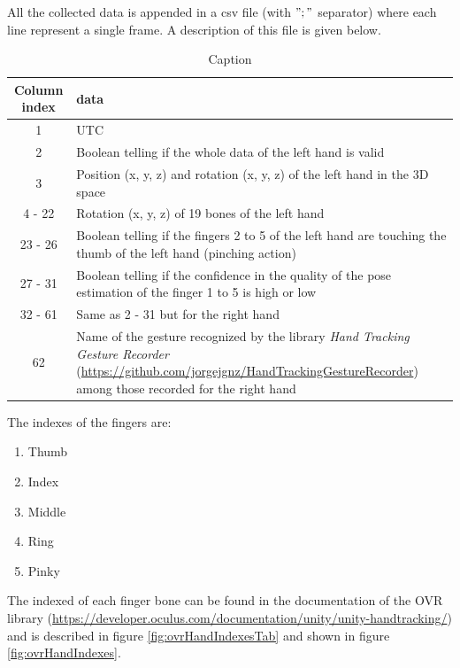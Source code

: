\documentclass{article}
\begin{document}
All the collected data is appended in a csv file (with $";"$ separator) where each line represent a single frame. A description of this file is given below.

\begin{table}[H]
	\centering
	\begin{tabular}{|c|p{12cm}|}
		\hline
		Column index & data \\
		\hline
		1 & UTC \\ \hline
		2 & Boolean telling if the whole data of the left hand is valid \\ \hline
		3 & Position (x, y, z) and rotation (x, y, z) of the left hand in the 3D space \\ \hline
		4 - 22 & Rotation (x, y, z) of 19 bones of the left hand \\ \hline
		23 - 26 & Boolean telling if the fingers 2 to 5 of the left hand are touching the thumb of the left hand (pinching action) \\ \hline
		27 - 31 & Boolean telling if the confidence in the quality of the pose estimation of the finger 1 to 5 is high or low \\ \hline
		32 - 61 & Same as 2 - 31 but for the right hand \\ \hline
		62 & Name of the gesture recognized by the library \textit{Hand Tracking Gesture  Recorder} (\url{https://github.com/jorgejgnz/HandTrackingGestureRecorder}) among those recorded for the right hand\\
		\hline
	\end{tabular}
	\caption{Caption}
	\label{tab:my_label}
\end{table}

The indexes of the fingers are:
\begin{enumerate}
	\item Thumb
	\item Index
	\item Middle
	\item Ring
	\item Pinky
\end{enumerate}

The indexed of each finger bone can be found in the documentation of the OVR library (\url{https://developer.oculus.com/documentation/unity/unity-handtracking/}) and is described in figure \ref{fig:ovrHandIndexesTab} and shown in figure \ref{fig:ovrHandIndexes}.
\end{document}
